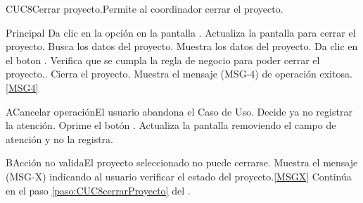 % 

	\begin{UseCase}{CUC8}{Cerrar proyecto.}{Permite al coordinador cerrar el proyecto.}
	\end{UseCase}
		
	\begin{UCtrayectoria}{Principal}
		\UCpaso[\UCactor] Da clic en la opción  en la pantalla .
		\UCpaso Actualiza la pantalla para cerrar el proyecto.\label{paso:CUC8cerrarProyecto}
		\UCpaso Busca los datos del proyecto.
		\UCpaso Muestra los datos del proyecto.
		\UCpaso [\UCactor] Da clic en el boton .
		\UCpaso Verifica que se cumpla la regla de negocio para poder cerrar el proyecto.. 
		\UCpaso Cierra el proyecto.
		\UCpaso Muestra el mensaje (MSG-4) de operación exitosa.\ref{MSG4}
	\end{UCtrayectoria}
		
	\begin{UCtrayectoriaA}{A}{Cancelar operación}{El usuario abandona el Caso de Uso.}
			\UCpaso[\UCactor] Decide ya no registrar la atención.
			\UCpaso[\UCactor] Oprime el botón .
			\UCpaso Actualiza la pantalla removiendo el campo de atención y no la registra. 
	\end{UCtrayectoriaA}

	\begin{UCtrayectoriaA}{B}{Acción no valida}{El proyecto seleccionado no puede cerrarse.}
			\UCpaso Muestra el mensaje (MSG-X) indicando al usuario verificar el estado del proyecto.\ref{MSGX}
			\UCpaso Continúa en el paso \ref{paso:CUC8cerrarProyecto} del .
	\end{UCtrayectoriaA}